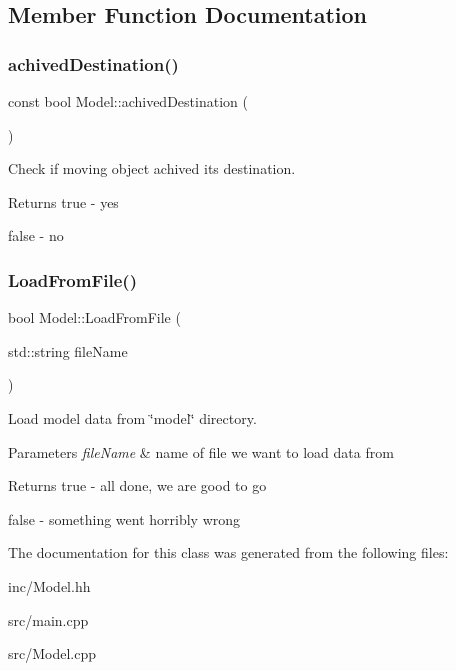 \subsection{Member Function Documentation}
\mbox{\label{class_model_aa24e073cc3aa8c325f503a0c73a86241}} 
\subsubsection{\texorpdfstring{achived\+Destination()}{achivedDestination()}}
{\footnotesize\ttfamily const bool Model\+::achived\+Destination (\begin{DoxyParamCaption}{ }\end{DoxyParamCaption})}



Check if moving object achived its destination. 

\begin{DoxyReturn}{Returns}
true -\/ yes 

false -\/ no 
\end{DoxyReturn}
\mbox{\label{class_model_aeac0bcc4a5389b6ec36db82ce76ee043}} 
\subsubsection{\texorpdfstring{Load\+From\+File()}{LoadFromFile()}}
{\footnotesize\ttfamily bool Model\+::\+Load\+From\+File (\begin{DoxyParamCaption}\item[{std\+::string}]{file\+Name }\end{DoxyParamCaption})}



Load model data from \char`\"{}model\char`\"{} directory. 


\begin{DoxyParams}{Parameters}
{\em file\+Name} & name of file we want to load data from \\
\hline
\end{DoxyParams}
\begin{DoxyReturn}{Returns}
true -\/ all done, we are good to go 

false -\/ something went horribly wrong 
\end{DoxyReturn}


The documentation for this class was generated from the following files\+:\begin{DoxyCompactItemize}
\item 
inc/Model.\+hh\item 
src/main.\+cpp\item 
src/Model.\+cpp\end{DoxyCompactItemize}
